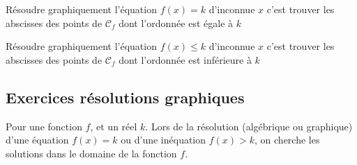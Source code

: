 \documentclass[main.tex]{subfiles}
\begin{document}
\begin{definition} Résoudre graphiquement l'équation $f(x) = k $  d'inconnue $x$ \fg{} c'est trouver les abscisses des points de $\mathscr{C}_f$ dont l'ordonnée est égale à $k$
\end{definition}
\begin{definition} Résoudre graphiquement l'équation $f(x) \leqslant k $  d'inconnue $x$ \fg{} c'est trouver les abscisses des points de $\mathscr{C}_f$ dont l'ordonnée est inférieure à $k$
\end{definition} 


 \newpage 
 \pagestyle{scrheadings} %
 \onehalfspacing
   
 \subsection{Exercices résolutions graphiques}
\begin{eBox} Pour une fonction $f$, et un réel $k$. Lors de la résolution (algébrique ou graphique) d'une équation $f(x)=k$ ou d'une inéquation $f(x)>k$, on cherche les solutions dans le domaine de la fonction $f$. 
\end{eBox}
 
  
 
\end{document}
